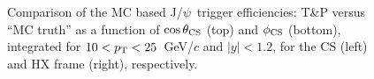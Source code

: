 \documentclass[12pt]{article}
\newcommand{\jpsi}{J/$\psi$}
\begin{document}
\begin{figure}[htbp]
\centering
{}
\caption{Comparison of the MC based \jpsi\ trigger efficiencies: T\&P
  versus ``MC truth'' as a function of $\cos\theta_{\rm CS}$ (top) and
  $\phi_{\rm CS}$ (bottom), integrated for $10 < p_{\rm T} <
  25$~GeV/$c$ and  $|y| < 1.2$, for the CS (left) and HX frame (right), respectively.}
\end{figure}
%
%
%
\end{document}
